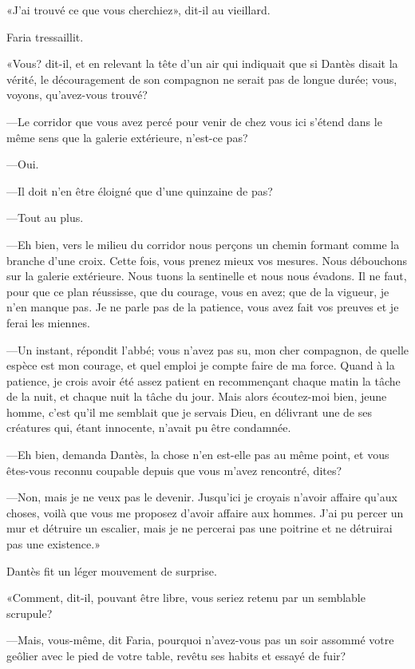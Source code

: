 «J'ai trouvé ce que vous cherchiez», dit-il au vieillard.

Faria tressaillit.

«Vous? dit-il, et en relevant la tête d'un air qui indiquait que si Dantès disait la vérité, le découragement de son compagnon ne serait pas de longue durée; vous, voyons, qu'avez-vous trouvé?

—Le corridor que vous avez percé pour venir de chez vous ici s'étend dans le même sens que la galerie extérieure, n'est-ce pas?

—Oui.

—Il doit n'en être éloigné que d'une quinzaine de pas?

—Tout au plus.

—Eh bien, vers le milieu du corridor nous perçons un chemin formant comme la branche d'une croix. Cette fois, vous prenez mieux vos mesures. Nous débouchons sur la galerie extérieure. Nous tuons la sentinelle et nous nous évadons. Il ne faut, pour que ce plan réussisse, que du courage, vous en avez; que de la vigueur, je n'en manque pas. Je ne parle pas de la patience, vous avez fait vos preuves et je ferai les miennes.

—Un instant, répondit l'abbé; vous n'avez pas su, mon cher compagnon, de quelle espèce est mon courage, et quel emploi je compte faire de ma force. Quand à la patience, je crois avoir été assez patient en recommençant chaque matin la tâche de la nuit, et chaque nuit la tâche du jour. Mais alors écoutez-moi bien, jeune homme, c'est qu'il me semblait que je servais Dieu, en délivrant une de ses créatures qui, étant innocente, n'avait pu être condamnée.

—Eh bien, demanda Dantès, la chose n'en est-elle pas au même point, et vous êtes-vous reconnu coupable depuis que vous m'avez rencontré, dites?


—Non, mais je ne veux pas le devenir. Jusqu'ici je croyais n'avoir affaire qu'aux choses, voilà que vous me proposez d'avoir affaire aux hommes. J'ai pu percer un mur et détruire un escalier, mais je ne percerai pas une poitrine et ne détruirai pas une existence.»

Dantès fit un léger mouvement de surprise.

«Comment, dit-il, pouvant être libre, vous seriez retenu par un semblable scrupule?

—Mais, vous-même, dit Faria, pourquoi n'avez-vous pas un soir assommé votre geôlier avec le pied de votre table, revêtu ses habits et essayé de fuir?

